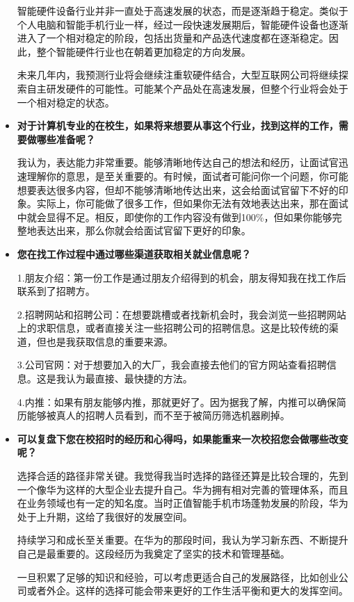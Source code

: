 \begin{itemize}
智能硬件设备行业并非一直处于高速发展的状态，而是逐渐趋于稳定。类似于个人电脑和智能手机行业一样，经过一段快速发展期后，智能硬件设备也逐渐进入了一个相对稳定的阶段，包括出货量和产品迭代速度都在逐渐稳定。因此，整个智能硬件行业也在朝着更加稳定的方向发展。

未来几年内，我预测行业将会继续注重软硬件结合，大型互联网公司将继续探索自主研发硬件的可能性。可能某个产品处在高速发展，但整个行业将会处于一个相对稳定的状态。

    \item \textbf{对于计算机专业的在校生，如果将来想要从事这个行业，找到这样的工作，需要做哪些准备呢？}

    我认为，表达能力非常重要。能够清晰地传达自己的想法和经历，让面试官迅速理解你的意思，是至关重要的。有时候，面试者可能问你一个问题，你可能想要表达很多内容，但却不能够清晰地传达出来，这会给面试官留下不好的印象。实际上，你可能做了很多工作，但如果你无法有效地表达出来，那在面试中就会显得不足。相反，即使你的工作内容没有做到100\%，但如果你能够完整地表达出来，那么你就会给面试官留下更好的印象。
    
    \item \textbf{您在找工作过程中通过哪些渠道获取相关就业信息呢？}

    1.朋友介绍：第一份工作是通过朋友介绍得到的机会，朋友得知我在找工作后联系到了招聘方。

2.招聘网站和招聘公司：在想要跳槽或者找新机会时，我会浏览一些招聘网站上的求职信息，或者直接关注一些招聘公司的招聘信息。这是比较传统的渠道，但也是我获取信息的重要来源。

3.公司官网：对于想要加入的大厂，我会直接去他们的官方网站查看招聘信息。这是我认为最直接、最快捷的方法。

4.内推：如果有朋友能够内推，那就更好了。因为据我了解，内推可以确保简历能够被真人的招聘人员看到，而不至于被简历筛选机器刷掉。

    \item \textbf{可以复盘下您在校招时的经历和心得吗，如果能重来一次校招您会做哪些改变呢？}
    
    选择合适的路径非常关键。我觉得我当时选择的路径还算是比较合理的，先到一个像华为这样的大型企业去提升自己。华为拥有相对完善的管理体系，而且在业务领域也有一定的知名度。当时正值智能手机市场蓬勃发展的阶段，华为处于上升期，这给了我很好的发展空间。

持续学习和成长至关重要。在华为的那段时间，我认为学习新东西、不断提升自己是最重要的。这段经历为我奠定了坚实的技术和管理基础。

一旦积累了足够的知识和经验，可以考虑更适合自己的发展路径，比如创业公司或者外企。这样的选择可能会带来更好的工作生活平衡和更大的发挥空间。


\end{itemize}
